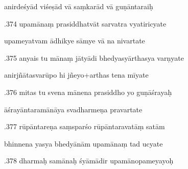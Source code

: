 \documentclass[article,12pt,a4paper]{memoir}%
\newcounter{parCount}
\begin{document}
	  
	  \pstart \leavevmode%
	anirdeśyād viśeṣād vā saṃkarād vā guṇāntaraiḥ 
	{}
	\pend%
      

	  
	  \pstart {}.374 upamānaṃ prasiddhatvāt sarvatra vyatiricyate 
	{}
	\pend%
      

	  
	  \pstart \leavevmode%
	upameyatvam ādhikye sāmye vā na nivartate 
	{}
	\pend%
      

	  
	  \pstart {}.375 anyais tu mānaṃ jātyādi bhedyasyārthasya varṇyate 
	{}
	\pend%
      

	  
	  \pstart \leavevmode%
	anirjñātasvarūpo hi jñeyo+arthas tena mīyate 
	{}
	\pend%
      

	  
	  \pstart {}.376 mitas tu svena mānena prasiddho yo guṇāśrayaḥ 
	{}
	\pend%
      

	  
	  \pstart \leavevmode%
	āśrayāntaramānāya svadharmeṇa pravartate 
	{}
	\pend%
      

	  
	  \pstart {}.377 rūpāntareṇa saṃsparśo rūpāntaravatāṃ satām 
	{}
	\pend%
      

	  
	  \pstart \leavevmode%
	bhinnena yasya bhedyānām upamānaṃ tad ucyate 
	{}
	\pend%
      

	  
	  \pstart {}.378 dharmaḥ samānaḥ śyāmādir upamānopameyayoḥ 
	{}
	\pend%
      
\end{document}

